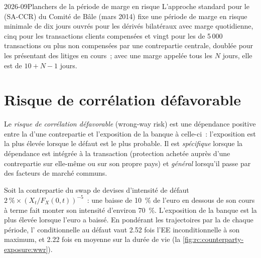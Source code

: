 \begin{dated}{2026-09}{Planchers de la période de marge en risque}\label{dat:rc:counterparty-exposure:mpor}
L'approche standard pour le  (SA-CCR) du Comité de Bâle (mars 2014)
fixe une période de marge en risque minimale de dix jours ouvrés pour les dérivés bilatéraux avec
marge quotidienne, cinq pour les transactions clients compensées et vingt pour les  de 5\,000 transactions ou plus
non compensées par une contrepartie centrale, doublée pour les  présentant des
litiges en cours~; avec une marge appelée tous les $N$ jours, elle est de $10+N-1$ jours.
\end{dated}

\section{Risque de corrélation défavorable}

\begin{definition}\label{def:rc:counterparty-exposure:wwr}
Le \emph{risque de corrélation défavorable} (wrong-way risk) est une dépendance positive entre la
 d'une contrepartie et l'exposition de la banque à celle-ci~: l'exposition est
la plus élevée lorsque le défaut est le plus probable. Il est \emph{spécifique} lorsque la dépendance est intégrée à
la transaction (protection achetée auprès d'une contrepartie sur elle-même ou sur son propre pays) et
\emph{général} lorsqu'il passe par des facteurs de marché communs.
\end{definition}

\begin{example}\label{ex:rc:counterparty-exposure:wwr}
Soit la contrepartie du swap de devises d'intensité de défaut $2~\%\times(X_t/F_X(0,t))^{-5}$~:
une baisse de 10~\% de l'euro en dessous de son cours à terme fait monter son intensité d'environ 70~\%. L'exposition de la
banque est la plus élevée lorsque l'euro a baissé. En pondérant les trajectoires par la  de chaque période, l' conditionnelle au défaut vaut 2.52 fois l'EE
inconditionnelle à son maximum, et 2.22 fois en moyenne sur la durée de vie
(la \cref{fig:rc:counterparty-exposure:wwr}).
\end{example}

